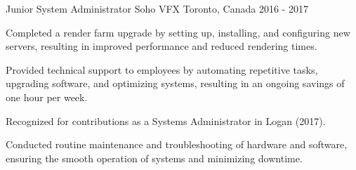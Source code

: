 \begin{cventries}
\cventry
	{Junior System Administrator}
	{Soho VFX}
	{Toronto, Canada}
	{2016 - 2017}
	{
		\begin{cvitems}
			\item Completed a render farm upgrade by setting up, installing, and configuring new servers, resulting in improved performance and reduced rendering times.
			\item Provided technical support to employees by automating repetitive tasks, upgrading software, and optimizing systems, resulting in an ongoing savings of one hour per week.
			\item Recognized for contributions as a Systems Administrator in Logan (2017).
			\item Conducted routine maintenance and troubleshooting of hardware and software, ensuring the smooth operation of systems and minimizing downtime.
		\end{cvitems}
	}

\end{cventries}
